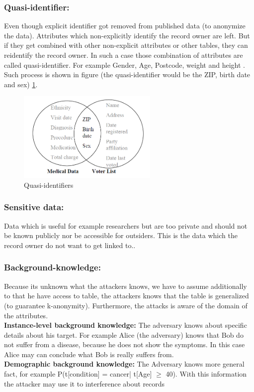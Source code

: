 \documentclass{llncs}
\begin{document}
\subsubsection{Quasi-identifier:}
Even though explicit identifier got removed from published data (to anonymize the data). Attributes which non-explicitly identify the record owner are left. But if they get combined with other non-explicit attributes or other tables, they can reidentify the record owner. In such a case those combination of attributes are called quasi-identifier. For example Gender, Age, Postcode, weight and height \cite{dalenius1986finding}. Such process is shown in figure (the quasi-identifier would be the ZIP, birth date and sex) \ref{quasiidentifier}.
\begin{figure}[]
	\centering
	\includegraphics[width=0.6\textwidth]{linkingdata.png}
	\caption{Quasi-identifiers}%
	\label{quasiidentifier}
\end{figure}
\subsubsection{Sensitive data:}
Data which is useful for example researchers but are too private and should not be known publicly nor be accessible for outsiders. This is the data which the record owner do not want to get linked to.\cite{ldiversity}.

\subsubsection{Background-knowledge:}
Because its unknown what the attackers knows, we have to assume additionally to that he have access to table, the attackers knows that the table is generalized (to guarantee k-anonymity). Furthermore, the attacks is aware of the domain of the attributes.\\
\textbf{Instance-level background knowledge:}
The adversary knows about specific details about his target. For example Alice (the adversary) knows that Bob do not suffer from a disease, because he does not show the symptoms. In this case Alice may can conclude what Bob is really suffers from.\\
\textbf{Demographic background knowledge:}
The Adversary knows more general fact, for example P(t[condition] = cancer| t[Age] $\geq$ 40). With this information the attacker may use it to interference about records \cite{ldiversity}
\end{document}
